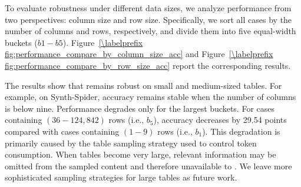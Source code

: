 





To evaluate robustness under different data sizes, we analyze performance from two perspectives: column size and row size. Specifically, we sort all cases by the number of columns and rows, respectively, and divide them into five equal-width buckets ($b1 - b5$). Figure~\ref{\labelprefix fig:performance_compare_by_column_size_acc} and Figure~\ref{\labelprefix fig:performance_compare_by_row_size_acc} report the corresponding results.

The results show that \sys remains robust on small and medium-sized tables. For example, on Synth-Spider, accuracy remains stable when the number of columns is below nine. 
Performance degrades only for the largest buckets. For cases containing $(36 - 124,842)$ rows (i.e., $b_5$), accuracy decreases by 29.54 points compared with cases containing $(1-9)$ rows (i.e., $b_1$). This degradation is primarily caused by the table sampling strategy used to control token consumption. When tables become very large, relevant information may be omitted from the sampled content and therefore unavailable to \sys. We leave more sophisticated sampling strategies for large tables as future work.

%


